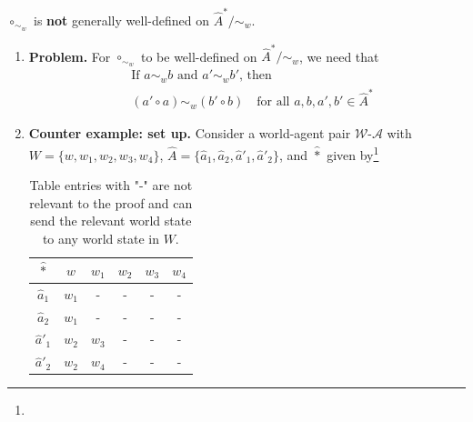 \begin{propositionE}
    $\circ_{\sim_{w}}$ is \textbf{not} generally well-defined on $\hat{A}^{*}/\sim_{w}$.
\end{propositionE}
\begin{proofE}
\begin{enumerate}
    \item \textbf{Problem.}
    For $\circ_{\sim_{w}}$ to be well-defined on $\hat{A}^{*}/\sim_{w}$, we need that
    \begin{equation}
    \begin{aligned}
        & \text{If $a \sim_{w} b$ and $a' \sim_{w} b'$, then} \\
        & (a' \circ a) \sim_{w} (b' \circ b) \quad \text{for all $a, b, a', b' \in \hat{A}^{*}$}
    \end{aligned}
    \end{equation}

    \item \textbf{Counter example: set up.}
    Consider a world-agent pair $\mathscr{W}$-$\mathscr{A}$ with $W = \{w, w_{1}, w_{2}, w_{3}, w_{4} \}$, $\hat{A} = \{ \hat{a}_{1}, \hat{a}_{2}, \hat{a}'_{1}, \hat{a}'_{2} \}$, and $\hat{\ast}$ given by\footnote{
    }
    \begin{table}[H]
        \centering
        \begin{tabular}{c|ccccc}
           $\hat{\ast}$    & $w$       & $w_{1}$   & $w_{2}$   & $w_{3}$   & $w_{4}$ \\
           \hline
           $\hat{a}_{1}$    & $w_{1}$   & -         & -         & -         & - \\
           $\hat{a}_{2}$    & $w_{1}$   & -         & -         & -         & - \\
           $\hat{a}'_{1}$   & $w_{2}$   & $w_{3}$   & -         & -         & - \\
           $\hat{a}'_{2}$   & $w_{2}$   & $w_{4}$   & -         & -         & - \\
        \end{tabular}
        \caption{
        Table entries with "-" are not relevant to the proof and can send the relevant world state to any world state in $W$.
        }
    \end{table}


\end{enumerate}
\end{proofE}
